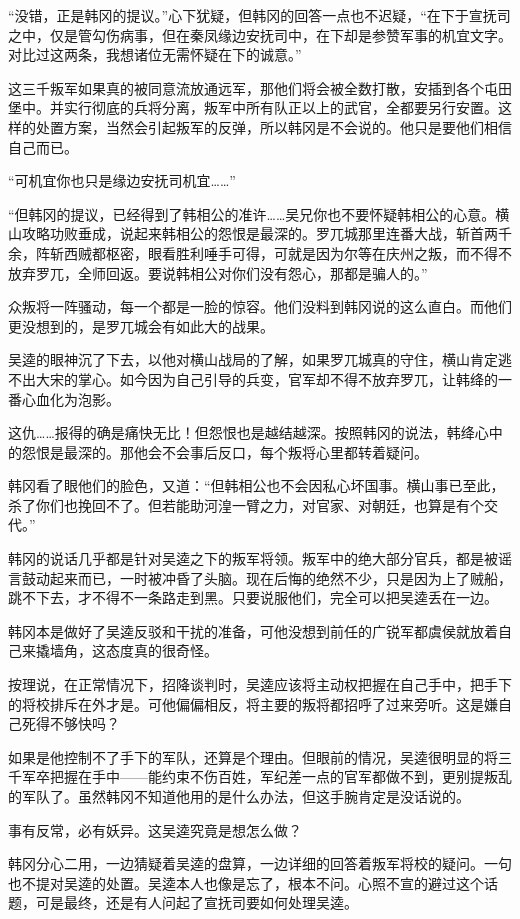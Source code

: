 “没错，正是韩冈的提议。”心下犹疑，但韩冈的回答一点也不迟疑，“在下于宣抚司之中，仅是管勾伤病事，但在秦凤缘边安抚司中，在下却是参赞军事的机宜文字。对比过这两条，我想诸位无需怀疑在下的诚意。”

这三千叛军如果真的被同意流放通远军，那他们将会被全数打散，安插到各个屯田堡中。并实行彻底的兵将分离，叛军中所有队正以上的武官，全都要另行安置。这样的处置方案，当然会引起叛军的反弹，所以韩冈是不会说的。他只是要他们相信自己而已。

“可机宜你也只是缘边安抚司机宜……”

“但韩冈的提议，已经得到了韩相公的准许……吴兄你也不要怀疑韩相公的心意。横山攻略功败垂成，说起来韩相公的怨恨是最深的。罗兀城那里连番大战，斩首两千余，阵斩西贼都枢密，眼看胜利唾手可得，可就是因为尔等在庆州之叛，而不得不放弃罗兀，全师回返。要说韩相公对你们没有怨心，那都是骗人的。”

众叛将一阵骚动，每一个都是一脸的惊容。他们没料到韩冈说的这么直白。而他们更没想到的，是罗兀城会有如此大的战果。

吴逵的眼神沉了下去，以他对横山战局的了解，如果罗兀城真的守住，横山肯定逃不出大宋的掌心。如今因为自己引导的兵变，官军却不得不放弃罗兀，让韩绛的一番心血化为泡影。

这仇……报得的确是痛快无比！但怨恨也是越结越深。按照韩冈的说法，韩绛心中的怨恨是最深的。那他会不会事后反口，每个叛将心里都转着疑问。

韩冈看了眼他们的脸色，又道：“但韩相公也不会因私心坏国事。横山事已至此，杀了你们也挽回不了。但若能助河湟一臂之力，对官家、对朝廷，也算是有个交代。”

韩冈的说话几乎都是针对吴逵之下的叛军将领。叛军中的绝大部分官兵，都是被谣言鼓动起来而已，一时被冲昏了头脑。现在后悔的绝然不少，只是因为上了贼船，跳不下去，才不得不一条路走到黑。只要说服他们，完全可以把吴逵丢在一边。

韩冈本是做好了吴逵反驳和干扰的准备，可他没想到前任的广锐军都虞侯就放着自己来撬墙角，这态度真的很奇怪。

按理说，在正常情况下，招降谈判时，吴逵应该将主动权把握在自己手中，把手下的将校排斥在外才是。可他偏偏相反，将主要的叛将都招呼了过来旁听。这是嫌自己死得不够快吗？

如果是他控制不了手下的军队，还算是个理由。但眼前的情况，吴逵很明显的将三千军卒把握在手中——能约束不伤百姓，军纪差一点的官军都做不到，更别提叛乱的军队了。虽然韩冈不知道他用的是什么办法，但这手腕肯定是没话说的。

事有反常，必有妖异。这吴逵究竟是想怎么做？

韩冈分心二用，一边猜疑着吴逵的盘算，一边详细的回答着叛军将校的疑问。一句也不提对吴逵的处置。吴逵本人也像是忘了，根本不问。心照不宣的避过这个话题，可是最终，还是有人问起了宣抚司要如何处理吴逵。

